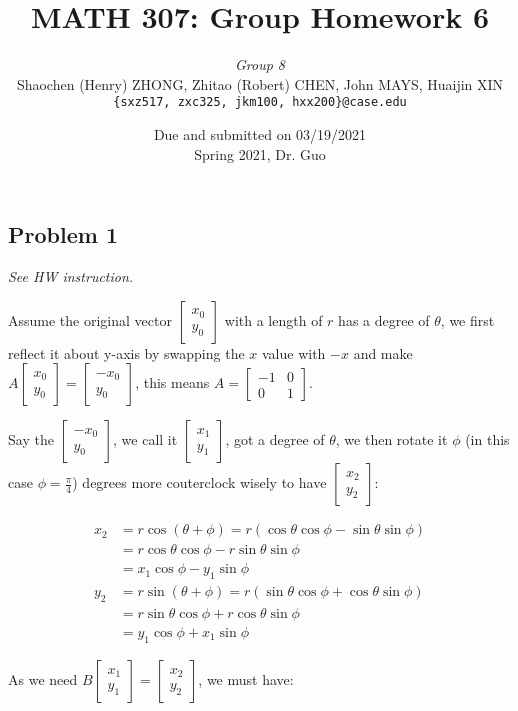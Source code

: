 \documentclass[11pt]{article}
\newcommand{\ilc}{\texttt}
\providecommand{\qbm}[1]{\begin{bmatrix} #1 \end{bmatrix}}
\begin{document}
\title{\textbf{MATH 307: Group Homework 6}}


\author{\textit{Group 8}\\
Shaochen (Henry) ZHONG, Zhitao (Robert) CHEN, John MAYS, Huaijin XIN\\ \ilc{\{sxz517, zxc325, jkm100, hxx200\}@case.edu}}

\date{Due and submitted on 03/19/2021 \\ Spring 2021, Dr. Guo}
\maketitle




\subsection*{Problem 1}
\textit{See HW instruction.}\newline


Assume the original vector $\qbm{x_0 \\ y_0}$ with a length of $r$ has a degree of $\theta$, we first reflect it about y-axis by swapping the $x$ value with $-x$ and make $A \qbm{x_0 \\ y_0} = \qbm{-x_0 \\ y_0}$, this means $A = \qbm{-1 & 0 \\ 0 & 1}$.


Say the $\qbm{-x_0 \\ y_0}$, we call it $\qbm{x_1 \\ y_1}$, got a degree of $\theta$, we then rotate it $\phi$ (in this case $\phi = \frac{\pi}{4}$) degrees more couterclock wisely to have $\qbm{x_2 \\ y_2}$:

\begin{align*}
    x_2 &= r \cos(\theta + \phi) = r(\cos \theta \cos \phi - \sin \theta \sin \phi) \\
    &= r \cos \theta \cos \phi - r \sin \theta \sin \phi \\
    &= x_1 \cos \phi - y_1 \sin \phi \\
    y_2 &= r \sin(\theta + \phi) = r(\sin \theta \cos \phi + \cos \theta \sin \phi) \\
    &= r\sin \theta \cos \phi + r\cos \theta \sin \phi \\
    &= y_1 \cos \phi + x_1 \sin \phi
\end{align*}

As we need $B \qbm{x_1 \\ y_1} = \qbm{x_2 \\ y_2}$, we must have:
\end{document}
